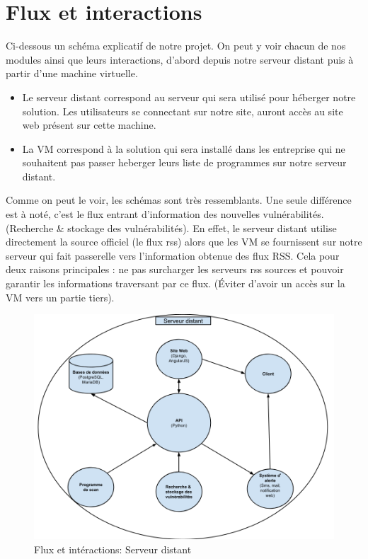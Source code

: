 \section{Flux et interactions}
Ci-dessous un schéma explicatif de notre projet. On peut y voir chacun de nos modules ainsi que leurs interactions, d'abord depuis notre serveur distant puis à partir d'une machine virtuelle.\\
\begin{itemize}
\item Le serveur distant correspond au serveur qui sera utilisé pour héberger notre solution. Les utilisateurs se connectant sur notre site, auront accès au site web présent sur cette machine.
\item La VM correspond à la solution qui sera installé dans les entreprise qui ne souhaitent pas passer heberger leurs liste de programmes sur notre serveur distant.
\end{itemize}
Comme on peut le voir, les schémas sont très ressemblants. Une seule différence est à noté, c'est le flux entrant d'information des nouvelles vulnérabilités. (\og{}Recherche \& stockage des vulnérabilités\fg{}). En effet, le serveur distant utilise directement la source officiel (le flux rss) alors que les VM se fournissent sur notre serveur qui fait passerelle vers l'information obtenue des flux RSS. Cela pour deux raisons principales : ne pas surcharger les serveurs rss sources et pouvoir garantir les informations traversant par ce flux. (Éviter d'avoir un accès sur la VM vers un partie tiers).\\

\begin{figure}[!h]
  \caption{Flux et intéractions: Serveur distant}
  \centering
  \vspace*{0.5cm}
  \includegraphics[width=18cm]{serveur-distant.png}
\end{figure}


